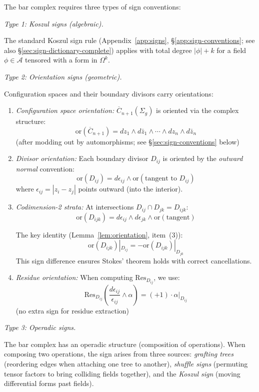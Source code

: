 \begin{convention}\label{conv:orientations-enhanced}
The bar complex requires three types of sign conventions:

\emph{Type 1: Koszul signs (algebraic).}

The standard Koszul sign rule (Appendix~\ref{app:signs}, \S\ref{app:sign-conventions}; see also \S\ref{sec:sign-dictionary-complete}) applies with total degree $|\phi| + k$ for a field $\phi \in \mathcal{A}$ tensored with a form in $\Omega^k$.

\emph{Type 2: Orientation signs (geometric).}

Configuration spaces and their boundary divisors carry orientations:

\begin{enumerate}
\item \emph{Configuration space orientation:} $\overline{C}_{n+1}(\Sigma_g)$ is oriented via the complex structure:
\[\text{or}(\overline{C}_{n+1}) = dz_1 \wedge d\bar{z}_1 \wedge \cdots \wedge dz_n \wedge d\bar{z}_n\]
(after modding out by automorphisms; see \S\ref{sec:sign-conventions} below)

\item \emph{Divisor orientation:} Each boundary divisor $D_{ij}$ is oriented by the \emph{outward normal} convention:
\[\text{or}(D_{ij}) = d\epsilon_{ij} \wedge \text{or}(\text{tangent to } D_{ij})\]
where $\epsilon_{ij} = |z_i - z_j|$ points outward (into the interior).

\item \emph{Codimension-2 strata:} At intersections $D_{ij} \cap D_{jk} = D_{ijk}$:
\[\text{or}(D_{ijk}) = d\epsilon_{ij} \wedge d\epsilon_{jk} \wedge \text{or}(\text{tangent})\]

The key identity (Lemma~\ref{lem:orientation}, item~(3)):
\[\text{or}(D_{ijk})|_{D_{ij}} = -\text{or}(D_{ijk})|_{D_{jk}}\]
This sign difference ensures Stokes' theorem holds with correct cancellations.

\item \emph{Residue orientation:} When computing $\text{Res}_{D_{ij}}$, we use:
\[\text{Res}_{D_{ij}}\left(\frac{d\epsilon_{ij}}{\epsilon_{ij}} \wedge \alpha\right) = (+1) \cdot \alpha|_{D_{ij}}\]
(no extra sign for residue extraction)
\end{enumerate}

\emph{Type 3: Operadic signs.}

The bar complex has an operadic structure (composition of operations). When composing two operations, the sign arises from three sources: \emph{grafting trees} (reordering edges when attaching one tree to another), \emph{shuffle signs} (permuting tensor factors to bring colliding fields together), and the \emph{Koszul sign} (moving differential forms past fields).


\end{convention}
